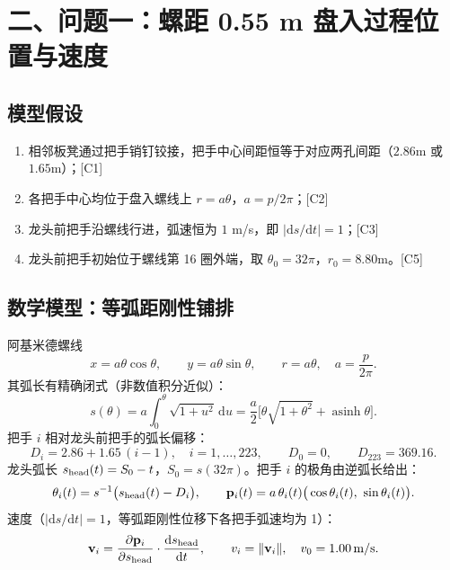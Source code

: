 \section*{二、问题一：螺距 0.55 m 盘入过程位置与速度}

\subsection{模型假设}
\begin{enumerate}
\item 相邻板凳通过把手销钉铰接，把手中心间距恒等于对应两孔间距（$2.86$m 或 $1.65$m）；[C1]
\item 各把手中心均位于盘入螺线上 $r=a\theta$，$a=p/2\pi$；[C2]
\item 龙头前把手沿螺线行进，弧速恒为 $1$ m/s，即 $\lvert\mathrm{d}s/\mathrm{d}t\rvert=1$；[C3]
\item 龙头前把手初始位于螺线第 16 圈外端，取 $\theta_0=32\pi$，$r_0=8.80$m。[C5]
\end{enumerate}

\subsection{数学模型：等弧距刚性铺排}
阿基米德螺线
\begin{equation}\label{eq:spiral}
x=a\theta\cos\theta,\qquad y=a\theta\sin\theta,\qquad r=a\theta,\quad a=\frac{p}{2\pi}.
\end{equation}
其弧长有精确闭式（非数值积分近似）：
\begin{equation}\label{eq:arclen}
s(\theta)=a\int_0^{\theta}\sqrt{1+u^2}\,\mathrm{d}u
=\frac{a}{2}\Big[\theta\sqrt{1+\theta^{2}}+\operatorname{asinh}\theta\Big].
\end{equation}
把手 $i$ 相对龙头前把手的弧长偏移：
\begin{equation}\label{eq:offset}
D_i=2.86+1.65\,(i-1),\quad i=1,\dots,223,\qquad D_0=0,\qquad D_{223}=369.16.
\end{equation}
龙头弧长 $s_{\rm head}(t)=S_0-t$，$S_0=s(32\pi)$。把手 $i$ 的极角由逆弧长给出：
\begin{equation}\label{eq:theta}
\theta_i(t)=s^{-1}\big(s_{\rm head}(t)-D_i\big),\qquad
\mathbf p_i(t)=a\,\theta_i(t)\big(\cos\theta_i(t),\ \sin\theta_i(t)\big).
\end{equation}
速度（$\lvert\mathrm{d}s/\mathrm{d}t\rvert=1$，等弧距刚性位移下各把手弧速均为 1）：
\begin{equation}\label{eq:vel}
\mathbf v_i=\frac{\partial\mathbf p_i}{\partial s_{\rm head}}\cdot\frac{\mathrm{d}s_{\rm head}}{\mathrm{d}t},\qquad
v_i=\lVert\mathbf v_i\rVert,\quad v_0=1.00\,\text{m/s}.
\end{equation}

